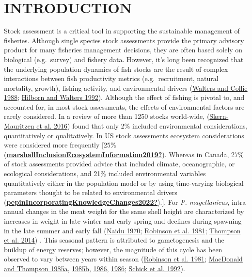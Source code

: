 \documentclass[
]{article}
\begin{document}
\hypertarget{ref-intro}{%
\section{INTRODUCTION}\label{ref-intro}}

Stock assessment is a critical tool in supporting the sustainable management of fisheries. Although single species stock assessments provide the primary advisory product for many fisheries management decisions, they are often based solely on biological (e.g.~survey) and fishery data. However, it's long been recognized that the underlying population dynamics of fish stocks are the result of complex interactions between fish productivity metrics (e.g.~recruitment, natural mortality, growth), fishing activity, and environmental drivers (\protect\hyperlink{ref-waltersResearchEnvironmentalFactors1988}{Walters and Collie 1988}; \protect\hyperlink{ref-hilbornQuantitativeFisheriesStock1992}{Hilborn and Walters 1992}). Although the effect of fishing is pivotal to, and accounted for, in most stock assessments, the effects of environmental factors are rarely considered. In a review of more than 1250 stocks world-wide, (\protect\hyperlink{ref-skern-mauritzenEcosystemProcessesAre2016}{Skern‐Mauritzen et al. 2016}) found that only 2\% included environmental considerations, quantitatively or qualitatively. In US stock assessments ecosystem considerations were considered more frequently {[}25\% (\protect\hyperlink{ref-marshallInclusionEcosystemInformation2019}{\textbf{marshallInclusionEcosystemInformation2019?}}). Whereas in Canada, 27\% of stock assessments provided advice that included climate, oceanographic, or ecological considerations, and 21\% included environmental variables quantitatively either in the population model or by using time-varying biological parameters thought to be related to environmental drivers (\protect\hyperlink{ref-pepinIncorporatingKnowledgeChanges2022}{\textbf{pepinIncorporatingKnowledgeChanges2022?}}).{]}. For \emph{P. magellanicus}, intra-annual changes in the meat weight for the same shell height are characterized by increases in weight in late winter and early spring and declines during spawning in the late summer and early fall (\protect\hyperlink{ref-naiduReproductionBreedingCycle1970}{Naidu 1970}; \protect\hyperlink{ref-robinsonSeasonalChangesSoftbody1981}{Robinson et al. 1981}; \protect\hyperlink{ref-thompsonIdentifyingSpawningEvents2014}{Thompson et al. 2014}) . This seasonal pattern is attributed to gametogenesis and the buildup of energy reserves; however, the magnitude of this cycle has been observed to vary between years within season (\protect\hyperlink{ref-robinsonSeasonalChangesSoftbody1981}{Robinson et al. 1981}; \protect\hyperlink{ref-macdonaldInfluenceTemperatureFood1985a}{MacDonald and Thompson 1985a}, \protect\hyperlink{ref-macdonaldInfluenceTemperatureFood1985}{1985b}, \protect\hyperlink{ref-macdonaldInfluenceTemperatureFood1986}{1986}, \protect\hyperlink{ref-macdonaldInfluenceTemperatureFood1986}{1986}; \protect\hyperlink{ref-schickAllometricRelationshipsGrowth1992}{Schick et al. 1992}).
\end{document}
